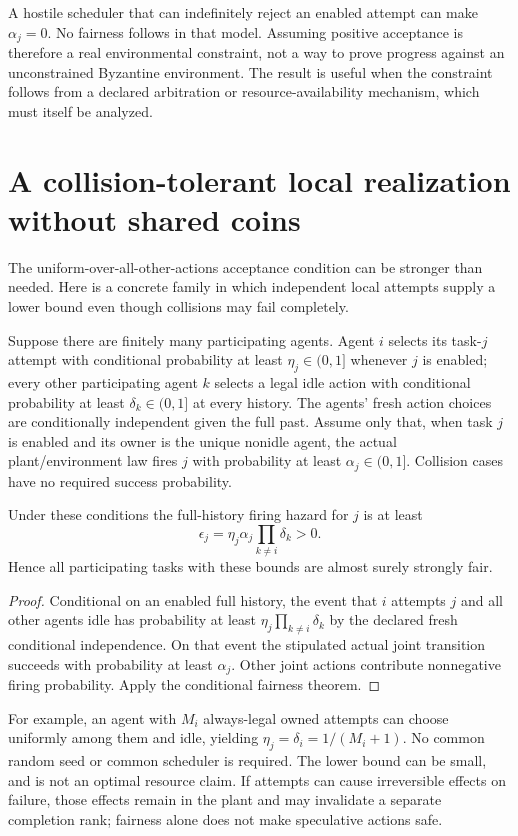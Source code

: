 \documentclass[11pt]{article}
\begin{document}
A hostile scheduler that can indefinitely reject an enabled attempt can make $\alpha_j=0$. No fairness follows in that model. Assuming positive acceptance is therefore a real environmental constraint, not a way to prove progress against an unconstrained Byzantine environment. The result is useful when the constraint follows from a declared arbitration or resource-availability mechanism, which must itself be analyzed.

\section{A collision-tolerant local realization without shared coins}
The uniform-over-all-other-actions acceptance condition can be stronger than needed. Here is a concrete family in which independent local attempts supply a lower bound even though collisions may fail completely.

Suppose there are finitely many participating agents. Agent $i$ selects its task-$j$ attempt with conditional probability at least $\eta_j\in(0,1]$ whenever $j$ is enabled; every other participating agent $k$ selects a legal idle action with conditional probability at least $\delta_k\in(0,1]$ at every history. The agents' fresh action choices are conditionally independent given the full past. Assume only that, when task $j$ is enabled and its owner is the unique nonidle agent, the actual plant/environment law fires $j$ with probability at least $\alpha_j\in(0,1]$. Collision cases have no required success probability.

\begin{proposition}
Under these conditions the full-history firing hazard for $j$ is at least
\[
 \epsilon_j=\eta_j\alpha_j\prod_{k\ne i}\delta_k>0.
\]
Hence all participating tasks with these bounds are almost surely strongly fair.
\end{proposition}
\begin{proof}
Conditional on an enabled full history, the event that $i$ attempts $j$ and all other agents idle has probability at least $\eta_j\prod_{k\ne i}\delta_k$ by the declared fresh conditional independence. On that event the stipulated actual joint transition succeeds with probability at least $\alpha_j$. Other joint actions contribute nonnegative firing probability. Apply the conditional fairness theorem.
\end{proof}

For example, an agent with $M_i$ always-legal owned attempts can choose uniformly among them and idle, yielding $\eta_j=\delta_i=1/(M_i+1)$. No common random seed or common scheduler is required. The lower bound can be small, and is not an optimal resource claim. If attempts can cause irreversible effects on failure, those effects remain in the plant and may invalidate a separate completion rank; fairness alone does not make speculative actions safe.
\end{document}
